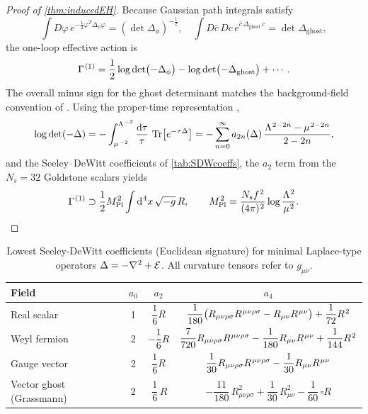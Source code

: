\documentclass[pdflatex,sn-mathphys-num]{sn-jnl}
\theoremstyle{thmstyleone}
\theoremstyle{thmstyletwo}%
\theoremstyle{thmstylethree}%
\newcommand{\Tr}{\operatorname{Tr}}
\newcommand{\sm}{\hspace{.065em}}
\newcommand{\smexp}[1]{^{\sm #1}}
\newcommand{\dv}[1]{\mathrm{d}\smexp{#1}}
\renewcommand{\arraystretch}{1.25}
\begin{document}
\begin{appendices}
\begin{proof}[Proof of \autoref{thm:inducedEH}]
Because Gaussian path integrals satisfy \cite{Peskin:1995ev,Abbott:1981ke}
\[
  \int D\varphi\,e^{-\tfrac12\varphi^{T}\Delta_{\phi}\varphi}
  =(\det\Delta_{\phi})^{-\tfrac12},
  \quad
  \int D\bar c\,Dc\,e^{\bar c\,\Delta_{\text{ghost}}\,c}
  =\det\Delta_{\text{ghost}},
\]
the one-loop effective action is
\[
  \Gamma\smexp{(1)}
  = \frac12\log\det\bigl(-\Delta_{\phi}\bigr)
    - \log\det\bigl(-\Delta_{\text{ghost}}\bigr)
    + \cdots.
\]
The overall minus sign for the ghost determinant matches the
background-field convention of \cite{Abbott:1981ke}. Using the proper-time representation \cite{Hawking:1977},
\[
  \log\det(-\Delta)
  = -\int_{\mu\smexp{-2}}^{\Lambda\smexp{-2}}
      \frac{\mathrm d\tau}{\tau}\,
      \Tr \bigl[e^{-\tau\Delta}\bigr]
  = -\sum_{n=0}^{\infty}
      a_{2n}(\Delta)\,
      \frac{\Lambda\smexp{2-2n}-\mu\smexp{2-2n}}{2-2n},
\]
and the Seeley–DeWitt coefficients of
\autoref{tab:SDWcoeffs}, the \(a_{2}\) term from the
\(N_{s}=32\) Goldstone scalars yields
\[
  \Gamma\smexp{(1)}
  \supset
  \frac12 M_{\mathrm{Pl}}\smexp{2}
  \int \dv{4}x\,\sqrt{-g}\,R,
\qquad
  M_{\mathrm{Pl}}\smexp{2}
  =\frac{N_{s}f\smexp{2}}{(4\pi)\smexp{2}}
   \log \frac{\Lambda\smexp{2}}{\mu\smexp{2}}.\qedhere
\]
\end{proof}


\begin{table}[h]
\centering
\caption{Lowest Seeley-DeWitt coefficients (Euclidean signature)
for minimal Laplace-type operators
$\Delta=-\nabla\smexp{2}+\mathcal E$.
All curvature tensors refer to $g_{\mu\nu}$.}
\label{tab:SDWcoeffs}
\renewcommand{\arraystretch}{1.5}
\begin{tabular}{lccc}
\hline
Field & $a_{0}$ & $a_{2}$ & $a_{4}$ \\
\hline
Real scalar & 
1 & 
$\dfrac{1}{6}R$ & 
\rule{0pt}{1.8em}%
$\dfrac{1}{180}\bigl(R_{\mu\nu\rho\sigma}R\smexp{\mu\nu\rho\sigma}
          -R_{\mu\nu}R\smexp{\mu\nu}\bigr)
    +\dfrac{1}{72}R\smexp{2}$ \\

Weyl fermion & 
2 & 
$-\dfrac{1}{6}R$ & 
\rule{0pt}{2.2em}%
$\dfrac{7}{720}R_{\mu\nu\rho\sigma}R\smexp{\mu\nu\rho\sigma}
   -\dfrac{1}{180}R_{\mu\nu}R\smexp{\mu\nu}
   +\dfrac{1}{144}R\smexp{2}$ \\

Gauge vector & 
2 & 
$\dfrac{1}{6}R$ & 
\rule{0pt}{2.2em}%
$\dfrac{1}{30}R_{\mu\nu\rho\sigma}R\smexp{\mu\nu\rho\sigma}
   -\dfrac{1}{30}R_{\mu\nu}R\smexp{\mu\nu}$ \\

Vector ghost (Grassmann) & 2 & $\,\dfrac16\,R$ & \rule{0pt}{2.2em} $-\dfrac{11}{180}\,R_{\mu\nu\rho\sigma}^{2}
          +\dfrac{1}{30}\,R_{\mu\nu}^{2}
          -\dfrac{1}{60}\,\square R$ \\[6pt]
\hline
\end{tabular}
\end{table}


\end{appendices}
\end{document}
